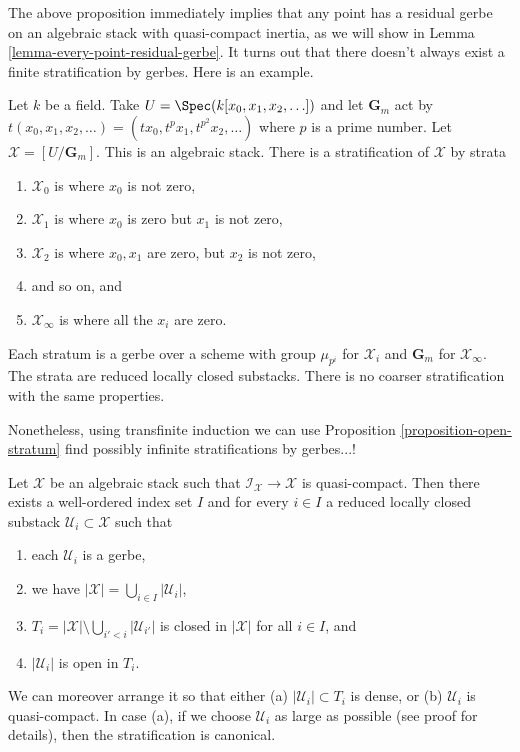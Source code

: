 \noindent
The above proposition immediately implies that any point has a residual
gerbe on an algebraic stack with quasi-compact inertia, as we will show in
Lemma \ref{lemma-every-point-residual-gerbe}.
It turns out that there doesn't always exist a finite stratification
by gerbes. Here is an example.

\begin{example}
\label{example-infinite-stratification}
Let $k$ be a field.
Take $U = \Spec(k[x_0, x_1, x_2, \ldots])$
and let $\mathbf{G}_m$ act by
$t(x_0, x_1, x_2, \ldots) = (tx_0, t^p x_1, t^{p^2} x_2, \ldots)$
where $p$ is a prime number. Let $\mathcal{X} = [U/\mathbf{G}_m]$.
This is an algebraic stack. There is a stratification of $\mathcal{X}$
by strata
\begin{enumerate}
\item $\mathcal{X}_0$ is where $x_0$ is not zero,
\item $\mathcal{X}_1$ is where $x_0$ is zero but $x_1$ is not zero,
\item $\mathcal{X}_2$ is where $x_0, x_1$ are zero, but $x_2$ is not zero,
\item and so on, and
\item $\mathcal{X}_{\infty}$ is where all the $x_i$ are zero.
\end{enumerate}
Each stratum is a gerbe over a scheme with group $\mu_{p^i}$ for
$\mathcal{X}_i$ and $\mathbf{G}_m$ for $\mathcal{X}_{\infty}$.
The strata are reduced locally closed substacks. There is no coarser
stratification with the same properties.
\end{example}

\noindent
Nonetheless, using transfinite induction we can use
Proposition \ref{proposition-open-stratum}
find possibly infinite stratifications by gerbes...!

\begin{lemma}
\label{lemma-every-point-in-a-stratum}
Let $\mathcal{X}$ be an algebraic stack such that
$\mathcal{I}_\mathcal{X} \to \mathcal{X}$ is quasi-compact.
Then there exists a well-ordered index set $I$ and for every $i \in I$
a reduced locally closed substack $\mathcal{U}_i \subset \mathcal{X}$ such that
\begin{enumerate}
\item each $\mathcal{U}_i$ is a gerbe,
\item we have $|\mathcal{X}| = \bigcup_{i \in I} |\mathcal{U}_i|$,
\item $T_i = |\mathcal{X}| \setminus \bigcup_{i' < i} |\mathcal{U}_{i'}|$
is closed in $|\mathcal{X}|$ for all $i \in I$, and
\item $|\mathcal{U}_i|$ is open in $T_i$.
\end{enumerate}
We can moreover arrange it so that either (a) $|\mathcal{U}_i| \subset T_i$
is dense, or (b) $\mathcal{U}_i$ is quasi-compact. In case (a), if
we choose $\mathcal{U}_i$ as large as possible (see proof for details), then
the stratification is canonical.
\end{lemma}

